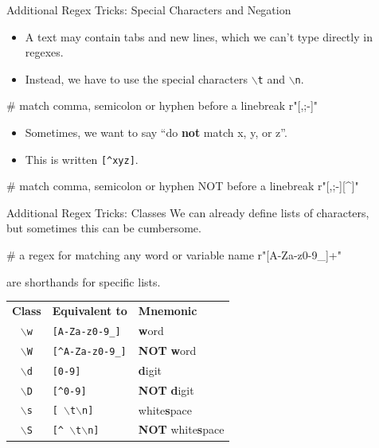 \documentclass[professionalfonts, xcolor={usenames,svgnames,x11names,table}]{beamer}
\begin{document}
\begin{frame}[fragile]{Additional Regex Tricks: Special Characters and Negation}
    \begin{itemize}
        \item A text may contain tabs and new lines, which we can't type directly in regexes.
        \item Instead, we have to use the special characters \texttt{$\backslash$t} and \texttt{$\backslash$n}.
    \end{itemize}
\begin{pythoncode}
    # match comma, semicolon or hyphen before a linebreak
    r"[,;-]\n"
\end{pythoncode}
    \begin{itemize}
        \item Sometimes, we want to say ``do \textbf{not} match x, y, or z''.
        \item This is written \texttt{[\^{}xyz]}.
    \end{itemize}
\begin{pythoncode}
    # match comma, semicolon or hyphen NOT before a linebreak
    r"[,;-][^\n]"
\end{pythoncode}
\end{frame}

\begin{frame}[fragile]{Additional Regex Tricks: Classes}
    We can already define lists of characters,\\
    but sometimes this can be cumbersome. 

\begin{pythoncode}
    # a regex for matching any word or variable name
    r"[A-Za-z0-9_]+"
\end{pythoncode}

     are shorthands for specific lists.

    \begin{center}
        \begin{tabular}{cll}
            \textbf{Class} & \textbf{Equivalent to} & \textbf{Mnemonic}\\
            \texttt{$\backslash$w} & \texttt{[A-Za-z0-9\_]}                     & \textbf{w}ord\\
            \texttt{$\backslash$W} & \texttt{[\^{}A-Za-z0-9\_]}                 & \textbf{NOT} \textbf{w}ord\\
            \texttt{$\backslash$d} & \texttt{[0-9]}                             & \textbf{d}igit\\
            \texttt{$\backslash$D} & \texttt{[\^{}0-9]}                         & \textbf{NOT} \textbf{d}igit\\
            \texttt{$\backslash$s} & \texttt{[ $\backslash$t$\backslash$n]}     & white\textbf{s}pace\\
            \texttt{$\backslash$S} & \texttt{[\^{} $\backslash$t$\backslash$n]} & \textbf{NOT} white\textbf{s}pace\\
        \end{tabular}
    \end{center}
\end{frame}
\end{document}
